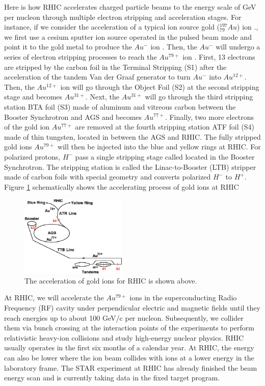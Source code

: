 Here is how RHIC accelerates charged particle beams to the energy scale of GeV per nucleon through multiple electron stripping and acceleration stages. For instance, if we consider the acceleration of a typical ion source gold (${}^{197}_{79}Au$) ion \cite{AuStripping}., we first use a cesium sputter ion source operated in the pulsed beam mode and point it to the gold metal to produce the $Au^-$ ion \cite{FirstAuSource}. Then, the $Au^{-}$ will undergo a series of electron stripping processes to reach the $Au^{79+}$ ion \cite{RHICStrpDetail}. First, 13 electrons are stripped by the carbon foil in the Terminal Stripping (S1) after the acceleration of the tandem Van der Graaf generator to turn $Au^{-}$ into $Au^{12+}$. Then, the $Au^{12+}$ ion will go through the Object Foil (S2) at the second stripping stage and becomes $Au^{31+}$. Next, the $Au^{31+}$ will go through the third stripping station BTA foil (S3) made of aluminum and vitreous carbon between the Booster Synchrotron and AGS and becomes $Au^{77+}$. Finally, two more electrons of the gold ion $Au^{77+}$ are removed at the fourth stripping station ATF foil (S4) made of thin tungsten, located in between the AGS and RHIC. The fully stripped gold ions $Au^{79+}$ will then be injected into the blue and yellow rings at RHIC. For polarized protons, $H^-$ pass a single stripping stage called located in the Booster Synchrotron. The stripping station is called the Linac-to-Booster (LTB) stripper made of carbon foils with special geometry and converts polarized $H^-$ to $H^+$. Figure \ref{AccAu} schematically shows the accelerating process of gold ions at RHIC \cite{AuStripRef}

\begin{figure}[hbtp]
\begin{center}
\includegraphics[width=0.45\textwidth]{Figures/Chapter1/AccAu.png}
\caption{The acceleration of gold ions for RHIC is shown above.}
\label{AccAu}
\end{center}
\end{figure} 

At RHIC, we will accelerate the $Au^{79+}$ ions in the superconducting Radio Frequency (RF) cavity under perpendicular electric and magnetic fields until they reach energies up to about 100 GeV/c per nucleon. Subsequently, we collider them via bunch crossing at the interaction points of the experiments to perform relativistic heavy-ion collisions and study high-energy nuclear physics. RHIC usually operates in the first six months of a calendar year. At RHIC, the energy can also be lower where the ion beam collides with ions at a lower energy in the laboratory frame. The STAR experiment at RHIC has already finished the beam energy scan and is currently taking data in the fixed target program. 

